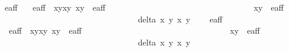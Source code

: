 \begin{isabellebody}
\ e{\isacharprime}{\isacharunderscore}aff{\isacharunderscore}{}\ \isanewline
\ \ {\isachardoublequoteopen}e{\isacharprime}{\isacharunderscore}aff{\isacharunderscore}{}\ {\isacharequal}\ {\isacharbraceleft}{\isacharparenleft}{\isacharparenleft}xyxy\ {\isacharparenleft}xy\ {\isasymin}\ e{\isacharprime}{\isacharunderscore}aff\ {\isasymand}\ \isanewline
\ \ \ \ \ \ \ \ \ \ \ \ \ \ \ \ \ \ \ \ \ \ \ \ \ \ \ \ \ \ \ \ \ {\isacharparenleft}xy\ {\isasymin}\ e{\isacharprime}{\isacharunderscore}aff\ {\isasymand}\ \isanewline
\ \ \ \ \ \ \ \ \ \ \ \ \ \ \ \ \ \ \ \ \ \ \ \ \ \ \ \ \ \ \ \ \ delta\ x\ y\ x\ y\ {\isasymnoteq}\ {}\ {\isacharbraceright}{\isachardoublequoteclose}\isanewline
\isanewline
{}\isamarkupfalse%
\ e{\isacharprime}{\isacharunderscore}aff{\isacharunderscore}{}\ \isanewline
\ \ {\isachardoublequoteopen}e{\isacharprime}{\isacharunderscore}aff{\isacharunderscore}{}\ {\isacharequal}\ {\isacharbraceleft}{\isacharparenleft}{\isacharparenleft}xyxy\ {\isacharparenleft}xy\ {\isasymin}\ e{\isacharprime}{\isacharunderscore}aff\ {\isasymand}\ \isanewline
\ \ \ \ \ \ \ \ \ \ \ \ \ \ \ \ \ \ \ \ \ \ \ \ \ \ \ \ \ \ \ \ \ {\isacharparenleft}xy\ {\isasymin}\ e{\isacharprime}{\isacharunderscore}aff\ {\isasymand}\ \isanewline
\ \ \ \ \ \ \ \ \ \ \ \ \ \ \ \ \ \ \ \ \ \ \ \ \ \ \ \ \ \ \ \ \ delta{\isacharprime}\ x\ y\ x\ y\ {\isasymnoteq}\ {}\ {\isacharbraceright}{\isachardoublequoteclose}\isanewline
\isanewline
{}\isamarkupfalse%

\end{isabellebody}
